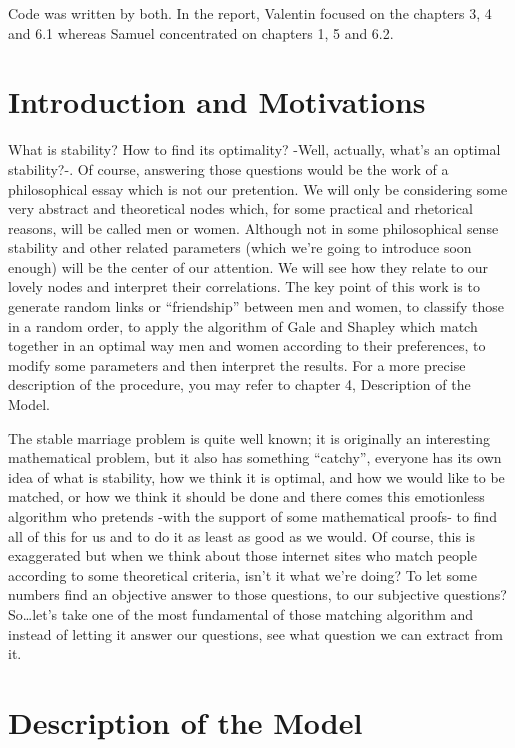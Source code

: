 \documentclass[11pt]{article}
\begin{document}
Code was written by both. In the report, Valentin focused on the chapters 3, 4 and 6.1 whereas Samuel concentrated on chapters 1, 5 and 6.2.

\section{Introduction and Motivations}

What is stability? How to find its optimality? -Well, actually, what’s an optimal stability?-. Of 
course, answering those questions would be the work of a philosophical essay which is not our 
pretention. We will only be considering some very abstract and theoretical nodes which, for some 
practical and rhetorical reasons, will be called men or women. 
Although not in some philosophical sense stability and other related parameters (which we’re going 
to introduce soon enough) will be the center of our attention. We will see how they relate to our 
lovely nodes and interpret their correlations. The key point of this work is to generate random links 
or “friendship” between men and women, to classify those in a random order, to apply the algorithm 
of Gale and Shapley which match together in an optimal way men and women according to their 
preferences, to modify some parameters and then interpret the results. For a more precise 
description of the procedure, you may refer to chapter 4, Description of the Model.

The stable marriage problem is quite well known; it is originally an interesting mathematical 
problem, but it also has something “catchy”, everyone has its own idea of what is stability, how we 
think it is optimal, and how we would like to be matched, or how we think it should be done and 
there comes this emotionless algorithm who pretends -with the support of some mathematical 
proofs- to find all of this for us and to do it as least as good as we would. Of course, this is 
exaggerated but when we think about those internet sites who match people according to some 
theoretical criteria, isn’t it what we’re doing? To let some numbers find an objective answer to those 
questions, to our subjective questions? So…let’s take one of the most fundamental of those matching 
algorithm and instead of letting it answer our questions, see what question we can extract from it.

\section{Description of the Model}
\end{document}
